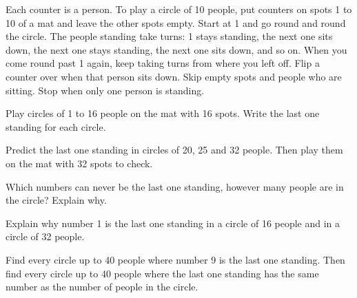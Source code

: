 \documentclass[12pt]{article}
\begin{document}
Each counter is a person. To play a circle of 10 people, put counters on spots 1 to 10 of a mat and leave the other spots empty. Start at 1 and go round and round the circle. The people standing take turns: 1 stays standing, the next one sits down, the next one stays standing, the next one sits down, and so on. When you come round past 1 again, keep taking turns from where you left off. Flip a counter over when that person sits down. Skip empty spots and people who are sitting. Stop when only one person is standing.

 Play circles of 1 to 16 people on the mat with 16 spots. Write the last one standing for each circle.

\noindent{}

\vspace{0.3cm}
\noindent{}

\vspace{0.5cm}
 Predict the last one standing in circles of 20, 25 and 32 people. Then play them on the mat with 32 spots to check.

\noindent{}

\vspace{0.5cm}
 Which numbers can never be the last one standing, however many people are in the circle? Explain why.

\noindent{}

\newpage
{} Explain why number 1 is the last one standing in a circle of 16 people and in a circle of 32 people.

\noindent{}

\vspace{0.5cm}
 Find every circle up to 40 people where number 9 is the last one standing. Then find every circle up to 40 people where the last one standing has the same number as the number of people in the circle.

\noindent{}

\vspace{0.3cm}
\noindent{}
\end{document}
